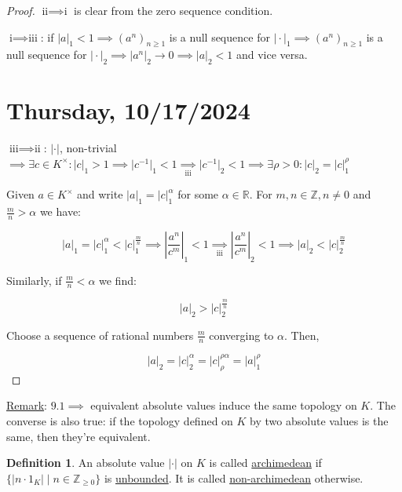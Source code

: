 \documentclass[openany]{amsbook}
\numberwithin{section}{chapter}
\theoremstyle{definition}
\newtheorem*{definition}{Definition}
\begin{document}
\begin{proof}
    \(\text{ii} \implies \text{i}\) is clear from the zero sequence condition.

    \(\text{i} \implies \text{iii}\): if \(\vert a \vert _1 < 1 \implies (a^n)_{n\geq 1}\) is a null sequence for \(\vert \cdot \vert _1 \implies (a^n)_{n\geq 1}\) is a null sequence for \(\vert \cdot \vert _2 \implies \vert a^n \vert_2 \to 0 \implies \vert a \vert _2 < 1\) and vice versa.  

\section*{Thursday, 10/17/2024}

    \(\text{iii} \implies \text{ii}\): \(\vert \cdot \vert\), non-trivial \(\implies \exists c\in K^\times : \vert c \vert _1 > 1 \implies \vert c ^{-1}  \vert _1 < 1 \underset{\text{iii}}{\implies} \vert c ^{-1} \vert _ 2 < 1 \implies \exists \rho > 0 : \vert c \vert _2 = \vert c \vert _1 ^ \rho\) 

    Given \(a \in K^\times\) and write \(\vert a \vert _1 = \vert c \vert _1 ^ \alpha\) for some \(\alpha \in \mathbb{R}\). For \(m,n \in \mathbb{Z}, n \neq 0\) and \(\frac{m}{n} > \alpha \) we have:
    
    \[
        \vert a \vert _ 1 = \vert c \vert _1^\alpha < \vert c \vert _1 ^{\frac{m}{n}} \implies \left\vert \frac{a^n}{c^m} \right\vert _ 1< 1 \underset{\text{iii}}{\implies} \left\vert \frac{a^n}{c^m} \right\vert _ 2< 1 \implies \vert a \vert _2 < \vert c \vert _2 ^{\frac{m}{n}}
    \]

    Similarly, if \(\frac{m}{n} < \alpha\) we find:

    \[
        \vert a \vert _2 > \vert c \vert _2 ^{\frac{m}{n}}
    \]

    Choose a sequence of rational numbers \(\frac{m}{n}\) converging to \(\alpha \). Then,

    \[
        \vert a \vert _2 = \vert c \vert _2 ^ \alpha = \vert c \vert ^{\rho \alpha}_{\rho} = \vert a \vert _1 ^ \rho 
    \]

\end{proof}

\underline{Remark}: \(9.1 \implies \) equivalent absolute values induce the same topology on \(K\). The converse is also true: if the topology defined on \(K\) by two absolute values is the same, then they're equivalent.

\begin{definition}
    An absolute value \(\vert \cdot \vert \) on \(K\) is called \underline{archimedean} if \(\{ \vert n \cdot 1_K \vert \mid n\in \mathbb{Z}_{\geq 0}\}\) is \underline{unbounded}. It is called \underline{non-archimedean} otherwise.
\end{definition}
\end{document}
